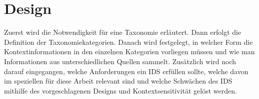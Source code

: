 \chapter{Design}%
\label{cha:design}

Zuerst wird die Notwendigkeit für eine Taxonomie erläutert. Dann erfolgt die Definition der Taxonomiekategorien. Danach wird festgelegt, in welcher Form die Kontextinformationen in den einzelnen Kategorien vorliegen müssen und wie man Informationen aus unterschiedlichen Quellen sammelt. Zusätzlich wird noch darauf eingegangen, welche Anforderungen ein IDS erfüllen sollte, welche davon im speziellen für diese Arbeit relevant sind und welche Schwächen des IDS mithilfe des vorgeschlagenen Designs und Kontextsensitivität gelöst werden.
